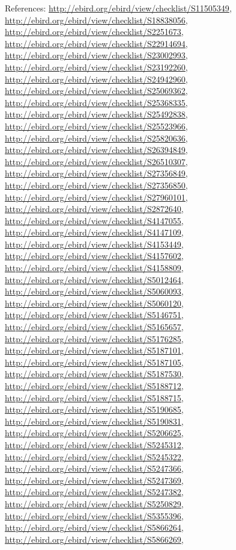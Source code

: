 \documentclass[9pt, article]{memoir}
\begin{document}
\begin{multicols}{2}
\vspace{6pt}References: 
\url{http://ebird.org/ebird/view/checklist/S11505349}, 
\url{http://ebird.org/ebird/view/checklist/S18838056}, 
\url{http://ebird.org/ebird/view/checklist/S2251673}, 
\url{http://ebird.org/ebird/view/checklist/S22914694}, 
\url{http://ebird.org/ebird/view/checklist/S23002993}, 
\url{http://ebird.org/ebird/view/checklist/S23192260}, 
\url{http://ebird.org/ebird/view/checklist/S24942960}, 
\url{http://ebird.org/ebird/view/checklist/S25069362}, 
\url{http://ebird.org/ebird/view/checklist/S25368335}, 
\url{http://ebird.org/ebird/view/checklist/S25492838}, 
\url{http://ebird.org/ebird/view/checklist/S25523966}, 
\url{http://ebird.org/ebird/view/checklist/S25820636}, 
\url{http://ebird.org/ebird/view/checklist/S26394849}, 
\url{http://ebird.org/ebird/view/checklist/S26510307}, 
\url{http://ebird.org/ebird/view/checklist/S27356849}, 
\url{http://ebird.org/ebird/view/checklist/S27356850}, 
\url{http://ebird.org/ebird/view/checklist/S27960101}, 
\url{http://ebird.org/ebird/view/checklist/S2872640}, 
\url{http://ebird.org/ebird/view/checklist/S4147055}, 
\url{http://ebird.org/ebird/view/checklist/S4147109}, 
\url{http://ebird.org/ebird/view/checklist/S4153449}, 
\url{http://ebird.org/ebird/view/checklist/S4157602}, 
\url{http://ebird.org/ebird/view/checklist/S4158809}, 
\url{http://ebird.org/ebird/view/checklist/S5012464}, 
\url{http://ebird.org/ebird/view/checklist/S5060093}, 
\url{http://ebird.org/ebird/view/checklist/S5060120}, 
\url{http://ebird.org/ebird/view/checklist/S5146751}, 
\url{http://ebird.org/ebird/view/checklist/S5165657}, 
\url{http://ebird.org/ebird/view/checklist/S5176285}, 
\url{http://ebird.org/ebird/view/checklist/S5187101}, 
\url{http://ebird.org/ebird/view/checklist/S5187105}, 
\url{http://ebird.org/ebird/view/checklist/S5187530}, 
\url{http://ebird.org/ebird/view/checklist/S5188712}, 
\url{http://ebird.org/ebird/view/checklist/S5188715}, 
\url{http://ebird.org/ebird/view/checklist/S5190685}, 
\url{http://ebird.org/ebird/view/checklist/S5190831}, 
\url{http://ebird.org/ebird/view/checklist/S5206625}, 
\url{http://ebird.org/ebird/view/checklist/S5245312}, 
\url{http://ebird.org/ebird/view/checklist/S5245322}, 
\url{http://ebird.org/ebird/view/checklist/S5247366}, 
\url{http://ebird.org/ebird/view/checklist/S5247369}, 
\url{http://ebird.org/ebird/view/checklist/S5247382}, 
\url{http://ebird.org/ebird/view/checklist/S5250829}, 
\url{http://ebird.org/ebird/view/checklist/S5355396}, 
\url{http://ebird.org/ebird/view/checklist/S5866264}, 
\url{http://ebird.org/ebird/view/checklist/S5866269}, 

\end{multicols}
\end{document}
